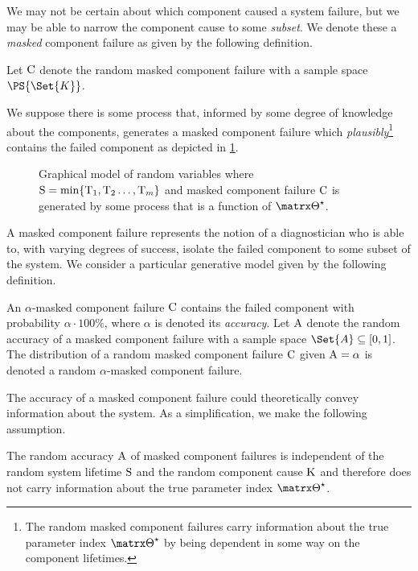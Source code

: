 \documentclass[../main.tex]{subfiles}
\begin{document}
We may not be certain about which component caused a system failure, but we may be able to narrow the component cause to some \emph{subset}.
We denote these a \emph{masked} component failure as given by the following definition.
\begin{definition}
\label{def:random_candidate_set}
Let $\mathrm{C}$ denote the random masked component failure with a sample space $\PS{\Set{K}}$.
\end{definition}

We suppose there is some process that, informed by some degree of knowledge about the components, generates a masked component failure which \emph{plausibly}\footnote{The random masked component failures carry information about the true parameter index $\tparam\sysparam$ by being dependent in some way on the component lifetimes.} contains the failed component as depicted in \cref{fig:gen_model}.
\begin{figure}
	\caption{Graphical model of random variables where $\mathrm{S} = \min\{\mathrm{T}_1,\mathrm{T}_2\ldots,\mathrm{T}_m\}$ and masked component failure $\mathrm{C}$ is generated by some process that is a function of $\tparam\sysparam$.}
	\label{fig:gen_model}
	\begin{center}
		
	\end{center}
\end{figure}

A masked component failure represents the notion of a diagnostician who is able to, with varying degrees of success, isolate the failed component to some subset of the system.
We consider a particular generative model given by the following definition.
\begin{definition}
\label{def:rv_A}
An $\alpha$-masked component failure $\mathrm{C}$ contains the failed component with probability $\alpha \cdot 100 \%$, where $\alpha$ is denoted its \emph{accuracy}.
Let $\mathrm{A}$ denote the random accuracy of a masked component failure with a sample space $\Set{A} \subseteq [0,1]$.
The distribution of a random masked component failure $\mathrm{C}$ given $\mathrm{A} = \alpha$ is denoted a random $\alpha$-masked component failure.
\end{definition}

The accuracy of a masked component failure could theoretically convey information about the system.
As a simplification, we make the following assumption.
\begin{assumption}
\label{asm:indep_A_S_K}
The random accuracy $\mathrm{A}$ of masked component failures is independent of the random system lifetime $\mathrm{S}$ and the random component cause $\mathrm{K}$ and therefore does not carry information about the true parameter index $\tparam\sysparam$.
\end{assumption}
\end{document}
